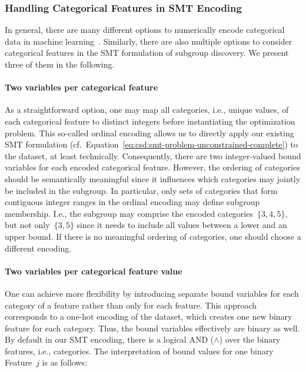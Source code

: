 \documentclass{article}
\theoremstyle{definition}
\begin{document}
\subsubsection{Handling Categorical Features in SMT Encoding}
\label{sec:csd:appendix:further-encodings:smt-categorical}

In general, there are many different options to numerically encode categorical data in machine learning~\cite{matteucci2023benchmark}.
Similarly, there are also multiple options to consider categorical features in the SMT formulation of subgroup discovery.
We present three of them in the following.

\paragraph{Two variables per categorical feature}

As a straightforward option, one may map all categories, i.e., unique values, of each categorical feature to distinct integers before instantiating the optimization problem.
This so-called ordinal encoding allows us to directly apply our existing SMT formulation (cf.~Equation~\ref{eq:csd:smt-problem-unconstrained-complete}) to the dataset, at least technically.
Consequently, there are two integer-valued bound variables for each encoded categorical feature.
However, the ordering of categories should be semantically meaningful since it influences which categories may jointly be included in the subgroup.
In particular, only sets of categories that form contiguous integer ranges in the ordinal encoding may define subgroup membership.
I.e., the subgroup may comprise the encoded categories~$\{3,4,5\}$, but not only~$\{3,5 \}$ since it needs to include all values between a lower and an upper bound.
If there is no meaningful ordering of categories, one should choose a different encoding.

\paragraph{Two variables per categorical feature value}

One can achieve more flexibility by introducing separate bound variables for each category of a feature rather than only for each feature.
This approach corresponds to a one-hot encoding of the dataset, which creates one new binary feature for each category.
Thus, the bound variables effectively are binary as well.
By default in our SMT encoding, there is a logical AND ($\land$) over the binary features, i.e., categories.
The interpretation of bound values for one binary Feature~$j$ is as follows:
\end{document}
